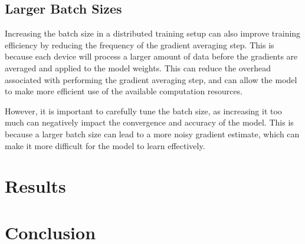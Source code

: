 \documentclass[10pt]{extarticle}
\begin{document}
\subsection*{Larger Batch Sizes}
Increasing the batch size in a distributed training setup can also improve training efficiency by reducing the frequency of the gradient averaging step. This is because each device will process a larger amount of data before the gradients are averaged and applied to the model weights. This can reduce the overhead associated with performing the gradient averaging step, and can allow the model to make more efficient use of the available computation resources.

However, it is important to carefully tune the batch size, as increasing it too much can negatively impact the convergence and accuracy of the model. This is because a larger batch size can lead to a more noisy gradient estimate, which can make it more difficult for the model to learn effectively.

\section{Results}
\section{Conclusion}
 
\end{document}
